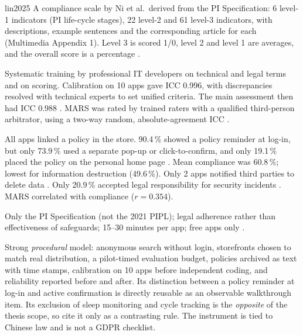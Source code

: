 \begin{papercard}{lin2025}
 A compliance scale by Ni et al.\ derived from the PI Specification: 6 level-1 indicators (PI life-cycle stages), 22 level-2 and 61 level-3 indicators, with descriptions, example sentences and the corresponding article for each (Multimedia Appendix 1). Level 3 is scored 1/0, level 2 and level 1 are averages, and the overall score is a percentage .

 Systematic training by professional IT developers on technical and legal terms and on scoring. Calibration on 10 apps gave ICC 0.996, with discrepancies resolved with technical experts to set unified criteria. The main assessment then had ICC 0.988 . MARS was rated by trained raters with a qualified third-person arbitrator, using a two-way random, absolute-agreement ICC .

 All apps linked a policy in the store. 90.4\,\% showed a policy reminder at log-in, but only 73.9\,\% used a separate pop-up or click-to-confirm, and only 19.1\,\% placed the policy on the personal home page . Mean compliance was 60.8\,\%; lowest for information destruction (49.6\,\%). Only 2 apps notified third parties to delete data . Only 20.9\,\% accepted legal responsibility for security incidents . MARS correlated with compliance ($r=0.354$).

 Only the PI Specification (not the 2021 PIPL); legal adherence rather than effectiveness of safeguards; 15--30 minutes per app; free apps only .

 Strong \emph{procedural} model: anonymous search without login, storefronts chosen to match real distribution, a pilot-timed evaluation budget, policies archived as text with time stamps, calibration on 10 apps before independent coding, and reliability reported before and after. Its distinction between a policy reminder at log-in and active confirmation is directly reusable as an observable walkthrough item. Its exclusion of sleep monitoring and cycle tracking is the \emph{opposite} of the thesis scope, so cite it only as a contrasting rule. The instrument is tied to Chinese law and is not a GDPR checklist.
\end{papercard}
